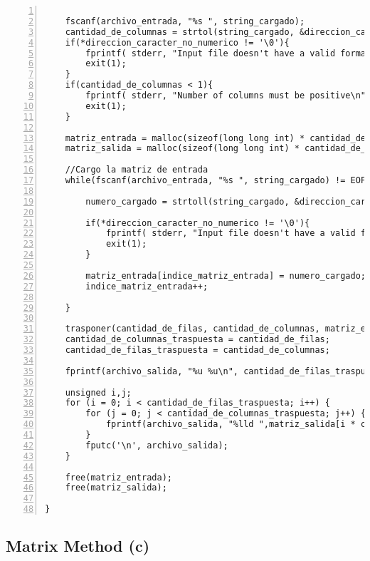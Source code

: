 \documentclass[11pt,a4paper]{article}
\begin{document}
\begin{lstlisting}[numbers=left, tabsize=2, basicstyle=\fontsize{11}{13}\ttfamily, frame=single, caption={makefile}]
        
    fscanf(archivo_entrada, "%s ", string_cargado);
    cantidad_de_columnas = strtol(string_cargado, &direccion_caracter_no_numerico, 0);
    if(*direccion_caracter_no_numerico != '\0'){
        fprintf( stderr, "Input file doesn't have a valid format\n"); 
        exit(1);
    }
    if(cantidad_de_columnas < 1){
        fprintf( stderr, "Number of columns must be positive\n"); 
        exit(1);
    }
    
    matriz_entrada = malloc(sizeof(long long int) * cantidad_de_filas * cantidad_de_columnas);
    matriz_salida = malloc(sizeof(long long int) * cantidad_de_filas * cantidad_de_columnas);
    
    //Cargo la matriz de entrada
    while(fscanf(archivo_entrada, "%s ", string_cargado) != EOF){
        
        numero_cargado = strtoll(string_cargado, &direccion_caracter_no_numerico, 0); //Esta en base 10;
        
        if(*direccion_caracter_no_numerico != '\0'){
            fprintf( stderr, "Input file doesn't have a valid format\n"); 
            exit(1);
        }
        
        matriz_entrada[indice_matriz_entrada] = numero_cargado;
        indice_matriz_entrada++;
        
    }
    
    trasponer(cantidad_de_filas, cantidad_de_columnas, matriz_entrada, matriz_salida);
    cantidad_de_columnas_traspuesta = cantidad_de_filas;
    cantidad_de_filas_traspuesta = cantidad_de_columnas;
    
    fprintf(archivo_salida, "%u %u\n", cantidad_de_filas_traspuesta, cantidad_de_columnas_traspuesta );
    
    unsigned i,j;
    for (i = 0; i < cantidad_de_filas_traspuesta; i++) {
        for (j = 0; j < cantidad_de_columnas_traspuesta; j++) {
            fprintf(archivo_salida, "%lld ",matriz_salida[i * cantidad_de_columnas_traspuesta + j]);
        } 
        fputc('\n', archivo_salida);
    }
    
    free(matriz_entrada);
    free(matriz_salida);
    
}

\end{lstlisting}


\subsection{Matrix Method (c)}
\end{document}

